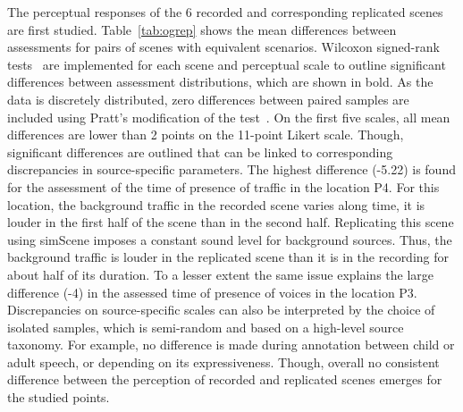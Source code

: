 \documentclass[twocolumn]{article}
\begin{document}
The perceptual responses of the 6 recorded and corresponding replicated scenes are first studied. Table~\ref{tab:ogrep} shows the mean differences between assessments for pairs of scenes with equivalent scenarios. Wilcoxon signed-rank tests~\cite{wilcoxon1945} are implemented for each scene and perceptual scale to outline significant differences between assessment distributions, which are shown in bold. As the data is discretely distributed, zero differences between paired samples are included using Pratt's modification of the test~\cite{pratt1959}. On the first five scales, all mean differences are lower than 2 points on the 11-point Likert scale. Though, significant differences are outlined that can be linked to corresponding discrepancies in source-specific parameters. The highest difference (-5.22) is found for the assessment of the time of presence of traffic in the location P4. For this location, the background traffic in the recorded scene varies along time, it is louder in the first half of the scene than in the second half. Replicating this scene using simScene imposes a constant sound level for background sources. Thus, the background traffic is louder in the replicated scene than it is in the recording for about half of its duration. To a lesser extent the same issue explains the large difference (-4) in the assessed time of presence of voices in the location P3. Discrepancies on source-specific scales can also be interpreted by the choice of isolated samples, which is semi-random and based on a high-level source taxonomy. For example, no difference is made during annotation between child or adult speech, or depending on its expressiveness. Though, overall no consistent difference between the perception of recorded and replicated scenes emerges for the studied points.
\end{document}
